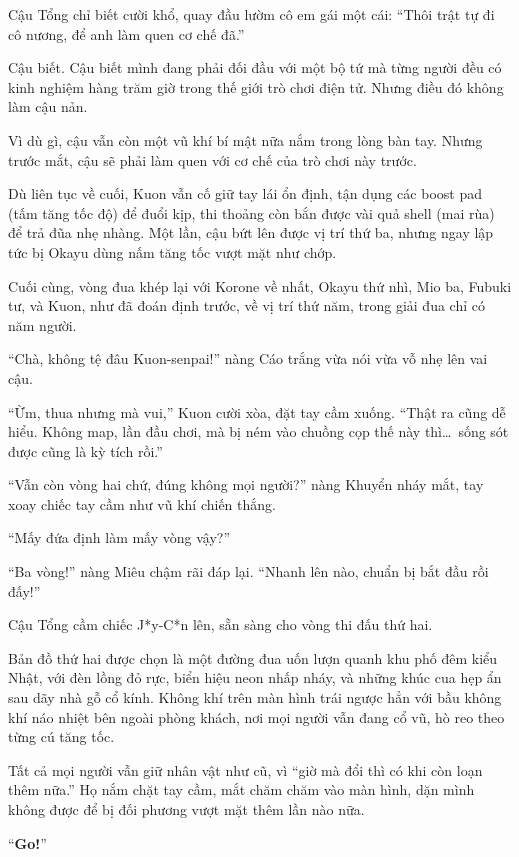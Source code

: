 \documentclass[../main.tex]{subfiles}
\begin{document}
Cậu Tổng chỉ biết cười khổ, quay đầu lườm cô em gái một cái: ``Thôi trật tự đi cô nương, để anh làm quen cơ chế đã.''

Cậu biết. Cậu biết mình đang phải đối đầu với một bộ tứ mà từng người đều có kinh nghiệm hàng trăm giờ trong thế giới trò chơi điện tử. Nhưng điều đó không làm cậu nản.

Vì dù gì, cậu vẫn còn một vũ khí bí mật nữa nắm trong lòng bàn tay. Nhưng trước mắt, cậu sẽ phải làm quen với cơ chế của trò chơi này trước.

Dù liên tục về cuối, Kuon vẫn cố giữ tay lái ổn định, tận dụng các boost pad (tấm tăng tốc độ) để đuổi kịp, thi thoảng còn bắn được vài quả shell (mai rùa) để trả đũa nhẹ nhàng. Một lần, cậu bứt lên được vị trí thứ ba, nhưng ngay lập tức bị Okayu dùng nấm tăng tốc vượt mặt như chớp.

Cuối cùng, vòng đua khép lại với Korone về nhất, Okayu thứ nhì, Mio ba, Fubuki tư, và Kuon, như đã đoán định trước, về vị trí thứ năm, trong giải đua chỉ có năm người.

``Chà, không tệ đâu Kuon-senpai!'' nàng Cáo trắng vừa nói vừa vỗ nhẹ lên vai cậu.

``Ừm, thua nhưng mà vui,'' Kuon cười xòa, đặt tay cầm xuống. ``Thật ra cũng dễ hiểu. Không map, lần đầu chơi, mà bị ném vào chuồng cọp thế này thì\dots\ sống sót được cũng là kỳ tích rồi.''

``Vẫn còn vòng hai chứ, đúng không mọi người?'' nàng Khuyển nháy mắt, tay xoay chiếc tay cầm như vũ khí chiến thắng.

``Mấy đứa định làm mấy vòng vậy?''

``Ba vòng!'' nàng Miêu chậm rãi đáp lại. ``Nhanh lên nào, chuẩn bị bắt đầu rồi đấy!''

Cậu Tổng cầm chiếc J*y-C*n lên, sẵn sàng cho vòng thi đấu thứ hai.

\ct

Bản đồ thứ hai được chọn là một đường đua uốn lượn quanh khu phố đêm kiểu Nhật, với đèn lồng đỏ rực, biển hiệu neon nhấp nháy, và những khúc cua hẹp ẩn sau dãy nhà gỗ cổ kính. Không khí trên màn hình trái ngược hẳn với bầu không khí náo nhiệt bên ngoài phòng khách, nơi mọi người vẫn đang cổ vũ, hò reo theo từng cú tăng tốc.

Tất cả mọi người vẫn giữ nhân vật như cũ, vì ``giờ mà đổi thì có khi còn loạn thêm nữa.'' Họ nắm chặt tay cầm, mắt chăm chăm vào màn hình, dặn mình không được để bị đối phương vượt mặt thêm lần nào nữa.

``\textbf{Go!}''
\end{document}
